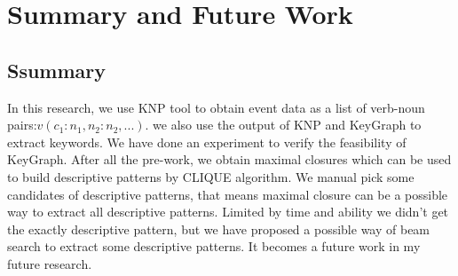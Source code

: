 \chapter{Summary and Future Work}
\section{Ssummary}
In this research, we use KNP tool to obtain event data as a list of verb-noun pairs:$v(c_1:n_1,n_2:n_2,...)$. we also use the output of KNP and KeyGraph to extract keywords. We have done an experiment to verify the feasibility of KeyGraph. After all the pre-work, we obtain maximal closures which can be used to build descriptive patterns by CLIQUE algorithm. We manual pick some candidates of descriptive patterns, that means maximal closure can be a possible way to extract all descriptive patterns. Limited by time and ability we didn't get the exactly descriptive pattern, but we have proposed a possible way of beam search to extract some descriptive patterns. It becomes a future work in my future research.